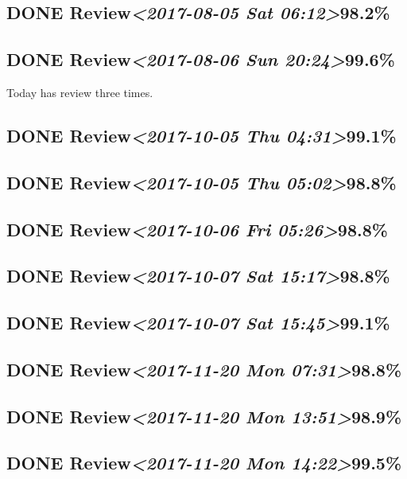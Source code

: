 \documentclass[11pt]{ctexart}
\begin{document}
\subsection{{\bfseries\sffamily DONE} Review\textit{<2017-08-05 Sat 06:12>}98.2\%}
\label{sec:orgb02ae66}
\subsection{{\bfseries\sffamily DONE} Review\textit{<2017-08-06 Sun 20:24>}99.6\%}
\label{sec:org930f69b}
Today has review three times.
\subsection{{\bfseries\sffamily DONE} Review\textit{<2017-10-05 Thu 04:31>}99.1\%}
\label{sec:orgfdb1d9b}
\subsection{{\bfseries\sffamily DONE} Review\textit{<2017-10-05 Thu 05:02>}98.8\%}
\label{sec:org930d7b3}
\subsection{{\bfseries\sffamily DONE} Review\textit{<2017-10-06 Fri 05:26>}98.8\%}
\label{sec:orgb793c6b}
\subsection{{\bfseries\sffamily DONE} Review\textit{<2017-10-07 Sat 15:17>}98.8\%}
\label{sec:orgcc41219}
\subsection{{\bfseries\sffamily DONE} Review\textit{<2017-10-07 Sat 15:45>}99.1\%}
\label{sec:org33e619b}

\subsection{{\bfseries\sffamily DONE} Review\textit{<2017-11-20 Mon 07:31>}98.8\%}
\label{sec:orgda27b19}
\subsection{{\bfseries\sffamily DONE} Review\textit{<2017-11-20 Mon 13:51>}98.9\%}
\label{sec:org72f521f}
\subsection{{\bfseries\sffamily DONE} Review\textit{<2017-11-20 Mon 14:22>}99.5\%}
\label{sec:orge6149b2}
\end{document}
